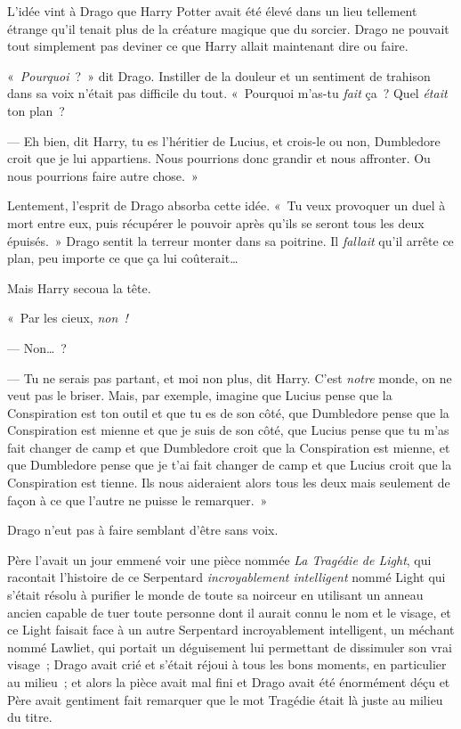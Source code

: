 L'idée vint à Drago que Harry Potter avait été élevé dans un lieu tellement étrange qu'il tenait plus de la créature magique que du sorcier.
Drago ne pouvait tout simplement pas deviner ce que Harry allait maintenant dire ou faire.

«~\emph{Pourquoi}~?~»
dit Drago.
Instiller de la douleur et un sentiment de trahison dans sa voix n'était pas difficile du tout.
«~Pourquoi m'as-tu \emph{fait} ça~?
Quel \emph{était} ton plan~?

--- Eh bien, dit Harry, tu es l'héritier de Lucius, et crois-le ou non, Dumbledore croit que je lui appartiens.
Nous pourrions donc grandir et nous affronter.
Ou nous pourrions faire autre chose.~»

Lentement, l'esprit de Drago absorba cette idée.
«~Tu veux provoquer un duel à mort entre eux, puis récupérer le pouvoir après qu'ils se seront tous les deux épuisés.~»
Drago sentit la terreur monter dans sa poitrine.
Il \emph{fallait} qu'il arrête ce plan, peu importe ce que ça lui coûterait…

Mais Harry secoua la tête.

«~Par les cieux, \emph{non~!}

--- Non…~?

--- Tu ne serais pas partant, et moi non plus, dit Harry.
C'est \emph{notre} monde, on ne veut pas le briser.
Mais, par exemple, imagine que Lucius pense que la Conspiration est ton outil et que tu es de son côté, que Dumbledore pense que la Conspiration est mienne et que je suis de son côté, que Lucius pense que tu m'as fait changer de camp et que Dumbledore croit que la Conspiration est mienne, et que Dumbledore pense que je t'ai fait changer de camp et que Lucius croit que la Conspiration est tienne.
Ils nous aideraient alors tous les deux mais seulement de façon à ce que l'autre ne puisse le remarquer.~»

Drago n'eut pas à faire semblant d'être sans voix.

Père l'avait un jour emmené voir une pièce nommée \emph{La Tragédie de Light}, qui racontait l'histoire de ce Serpentard \emph{incroyablement intelligent} nommé Light qui s'était résolu à purifier le monde de toute sa noirceur en utilisant un anneau ancien capable de tuer toute personne dont il aurait connu le nom et le visage, et ce Light faisait face à un autre Serpentard incroyablement intelligent, un méchant nommé Lawliet, qui portait un déguisement lui permettant de dissimuler son vrai visage~; Drago avait crié et s'était réjoui à tous les bons moments, en particulier au milieu~; et alors la pièce avait mal fini et Drago avait été énormément déçu et Père avait gentiment fait remarquer que le mot Tragédie était là juste au milieu du titre.

